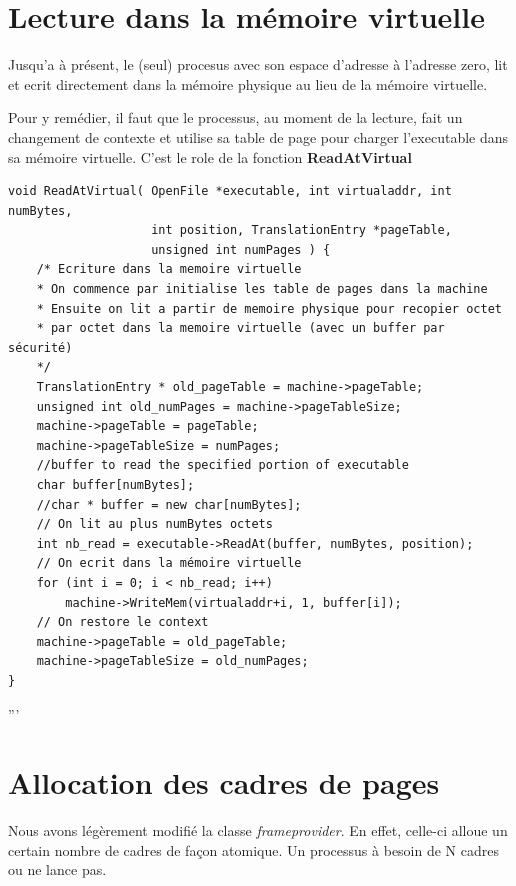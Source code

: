\documentclass[a4paper,10pt]{article}
\begin{document}
\section{Lecture dans la mémoire virtuelle}

Jusqu'a à présent, le (seul) procesus avec son espace d'adresse à l'adresse
zero, lit et ecrit directement dans la mémoire physique au lieu de la mémoire
virtuelle.

Pour y remédier, il faut que le processus, au moment de la lecture, fait un
changement de contexte et utilise sa table de page pour charger l'executable
dans sa mémoire virtuelle. C'est le role de la fonction \textbf{ReadAtVirtual}

\begin{lstlisting}
void ReadAtVirtual( OpenFile *executable, int virtualaddr, int numBytes,
                    int position, TranslationEntry *pageTable,
                    unsigned int numPages ) {
    /* Ecriture dans la memoire virtuelle
    * On commence par initialise les table de pages dans la machine
    * Ensuite on lit a partir de memoire physique pour recopier octet
    * par octet dans la memoire virtuelle (avec un buffer par sécurité)
    */
    TranslationEntry * old_pageTable = machine->pageTable;
    unsigned int old_numPages = machine->pageTableSize;
    machine->pageTable = pageTable;
    machine->pageTableSize = numPages;
    //buffer to read the specified portion of executable
    char buffer[numBytes];
    //char * buffer = new char[numBytes];
    // On lit au plus numBytes octets
    int nb_read = executable->ReadAt(buffer, numBytes, position);
    // On ecrit dans la mémoire virtuelle
    for (int i = 0; i < nb_read; i++)
        machine->WriteMem(virtualaddr+i, 1, buffer[i]);
    // On restore le context
    machine->pageTable = old_pageTable;
    machine->pageTableSize = old_numPages;
}
\end{lstlisting}

'''


\section{Allocation des cadres de pages}

Nous avons légèrement modifié la classe \textit{frameprovider}. En effet,
celle-ci alloue un certain nombre de cadres de façon atomique. Un
processus à besoin de N cadres ou ne lance pas.
\end{document}
